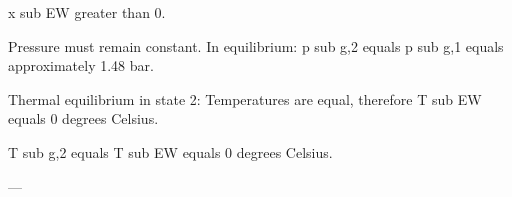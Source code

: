 x sub EW greater than 0.  

Pressure must remain constant. In equilibrium:  
p sub g,2 equals p sub g,1 equals approximately 1.48 bar.  

Thermal equilibrium in state 2:  
Temperatures are equal, therefore T sub EW equals 0 degrees Celsius.  

T sub g,2 equals T sub EW equals 0 degrees Celsius.  

---